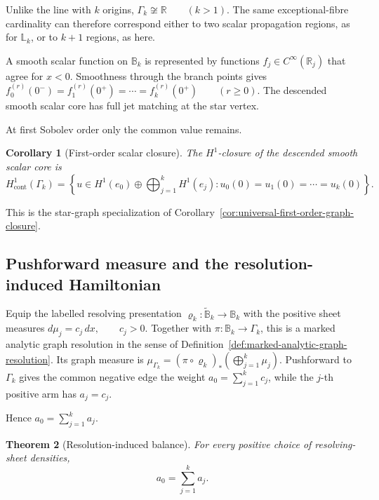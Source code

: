 \documentclass[11pt]{article}
\theoremstyle{plain}
\newtheorem{theorem}{Theorem}[section]
\newtheorem{corollary}[theorem]{Corollary}
\theoremstyle{definition}
\begin{document}
Unlike the line with \(k\) origins,
\(\Gamma_k\not\cong\mathbb R \qquad (k>1)\).
The same exceptional-fibre cardinality can therefore correspond either to
two scalar propagation regions, as for \(\mathbb L_k\), or to \(k+1\)
regions, as here.

A smooth scalar function on \(\mathbb B_k\) is represented by functions \(f_j\in C^\infty(\mathbb R_j)\) that agree for \(x<0\). Smoothness through the branch points gives
\(f_0^{(r)}(0^-) = f_1^{(r)}(0^+) = \cdots = f_k^{(r)}(0^+) \qquad (r\geq0)\).
The descended smooth scalar core has full jet matching at the star
vertex.

At first Sobolev order only the common value remains.

\begin{corollary}[First-order scalar closure]
\label{cor:Bk-H1-closure}
The \(H^1\)-closure of the descended smooth scalar core is
\[
  H^1_{\mathrm{cont}}(\Gamma_k)
  =
  \left\{
    u\in
    H^1(e_0)\oplus
    \bigoplus_{j=1}^{k}H^1(e_j):
    u_0(0)=u_1(0)=\cdots=u_k(0)
  \right\}.
\]
\end{corollary}

This is the star-graph specialization of
Corollary~\ref{cor:universal-first-order-graph-closure}.

\subsection{Pushforward measure and the resolution-induced Hamiltonian}
\label{subsec:Bk-measure}
\label{subsec:Bk-Hamiltonian}
\label{subsec:Bk-topology-measure}

Equip the labelled resolving presentation
\(\varrho_k:\widetilde{\mathbb B}_k\to\mathbb B_k\) with the positive sheet
measures
\(d\mu_j=c_j\,dx, \qquad c_j>0\).
Together with \(\pi:\mathbb B_k\to\Gamma_k\), this is a marked analytic graph
resolution in the sense of
Definition~\ref{def:marked-analytic-graph-resolution}. Its graph measure is
\(\mu_{\Gamma_k} = (\pi\circ\varrho_k)_* \left( \bigoplus_{j=1}^k\mu_j \right)\).
Pushforward to \(\Gamma_k\) gives the common negative edge the weight
\(a_0 = \sum_{j=1}^{k}c_j\),
while the \(j\)-th positive arm has
\(a_j=c_j\).

Hence
\(a_0=\sum_{j=1}^{k}a_j\).

\begin{theorem}[Resolution-induced balance]
\label{thm:Bk-weight-balance}
For every positive choice of resolving-sheet densities,
\[
  a_0
  =
  \sum_{j=1}^{k}a_j.
\]
\end{theorem}
\end{document}
